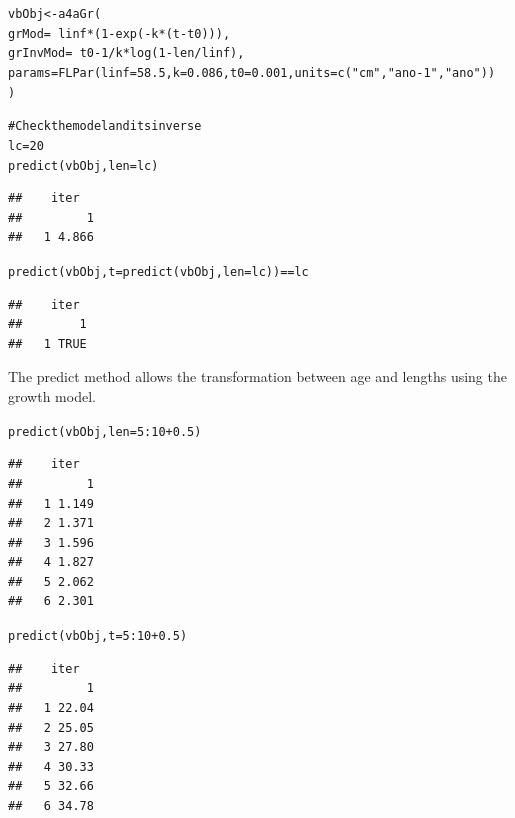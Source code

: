 \documentclass[a4paper,english,10pt]{article}\usepackage[]{graphicx}\usepackage[]{color}
\makeatletter
\newcommand{\hlnum}[1]{\textcolor[rgb]{0.2,0.2,0.2}{#1}}%
\newcommand{\hlstr}[1]{\textcolor[rgb]{0.2,0.2,0.2}{#1}}%
\newcommand{\hlcom}[1]{\textcolor[rgb]{0.2,0.267,0.4}{#1}}%
\newcommand{\hlopt}[1]{\textcolor[rgb]{0.2,0.2,0.2}{#1}}%
\newcommand{\hlstd}[1]{\textcolor[rgb]{0,0,0}{#1}}%
\newcommand{\hlkwb}[1]{\textcolor[rgb]{0.361,0.506,0.596}{#1}}%
\newcommand{\hlkwc}[1]{\textcolor[rgb]{0.361,0.506,0.596}{#1}}%
\newcommand{\hlkwd}[1]{\textcolor[rgb]{0.361,0.506,0.596}{#1}}%
\newenvironment{kframe}{%
 \def\at@end@of@kframe{}%
 \ifinner\ifhmode%
  \def\at@end@of@kframe{\end{minipage}}%
  \begin{minipage}{\columnwidth}%
 \fi\fi%
 \def\FrameCommand##1{\hskip\@totalleftmargin \hskip-\fboxsep
 \colorbox{shadecolor}{##1}\hskip-\fboxsep
     \hskip-\linewidth \hskip-\@totalleftmargin \hskip\columnwidth}%
 \MakeFramed {\advance\hsize-\width
   \@totalleftmargin\z@ \linewidth\hsize
   \@setminipage}}%
 {\par\unskip\endMakeFramed%
 \at@end@of@kframe}
\newenvironment{knitrout}{}{} %
\makeatother
\begin{document}
\begin{knitrout}
\color{fgcolor}\begin{kframe}
\begin{alltt}
\hlstd{vbObj} \hlkwb{<-} \hlkwd{a4aGr}\hlstd{(}
        \hlkwc{grMod}\hlstd{=}\hlopt{~}\hlstd{linf}\hlopt{*}\hlstd{(}\hlnum{1}\hlopt{-}\hlkwd{exp}\hlstd{(}\hlopt{-}\hlstd{k}\hlopt{*}\hlstd{(t}\hlopt{-}\hlstd{t0))),}
        \hlkwc{grInvMod}\hlstd{=}\hlopt{~}\hlstd{t0}\hlopt{-}\hlnum{1}\hlopt{/}\hlstd{k}\hlopt{*}\hlkwd{log}\hlstd{(}\hlnum{1}\hlopt{-}\hlstd{len}\hlopt{/}\hlstd{linf),}
        \hlkwc{params}\hlstd{=}\hlkwd{FLPar}\hlstd{(}\hlkwc{linf}\hlstd{=}\hlnum{58.5}\hlstd{,} \hlkwc{k}\hlstd{=}\hlnum{0.086}\hlstd{,} \hlkwc{t0}\hlstd{=}\hlnum{0.001}\hlstd{,} \hlkwc{units}\hlstd{=}\hlkwd{c}\hlstd{(}\hlstr{"cm"}\hlstd{,}\hlstr{"ano-1"}\hlstd{,}\hlstr{"ano"}\hlstd{))}
\hlstd{)}

\hlcom{# Check the model and its inverse}
\hlstd{lc}\hlkwb{=}\hlnum{20}
\hlkwd{predict}\hlstd{(vbObj,} \hlkwc{len}\hlstd{=lc)}
\end{alltt}
\begin{verbatim}
##    iter
##         1
##   1 4.866
\end{verbatim}
\begin{alltt}
\hlkwd{predict}\hlstd{(vbObj,} \hlkwc{t}\hlstd{=}\hlkwd{predict}\hlstd{(vbObj,} \hlkwc{len}\hlstd{=lc))}\hlopt{==}\hlstd{lc}
\end{alltt}
\begin{verbatim}
##    iter
##        1
##   1 TRUE
\end{verbatim}
\end{kframe}
\end{knitrout}

The predict method allows the transformation between age and lengths using the growth model.

\begin{knitrout}
\color{fgcolor}\begin{kframe}
\begin{alltt}
\hlkwd{predict}\hlstd{(vbObj,} \hlkwc{len}\hlstd{=}\hlnum{5}\hlopt{:}\hlnum{10}\hlopt{+}\hlnum{0.5}\hlstd{)}
\end{alltt}
\begin{verbatim}
##    iter
##         1
##   1 1.149
##   2 1.371
##   3 1.596
##   4 1.827
##   5 2.062
##   6 2.301
\end{verbatim}
\begin{alltt}
\hlkwd{predict}\hlstd{(vbObj,} \hlkwc{t}\hlstd{=}\hlnum{5}\hlopt{:}\hlnum{10}\hlopt{+}\hlnum{0.5}\hlstd{)}
\end{alltt}
\begin{verbatim}
##    iter
##         1
##   1 22.04
##   2 25.05
##   3 27.80
##   4 30.33
##   5 32.66
##   6 34.78
\end{verbatim}
\end{kframe}
\end{knitrout}
\end{document}
